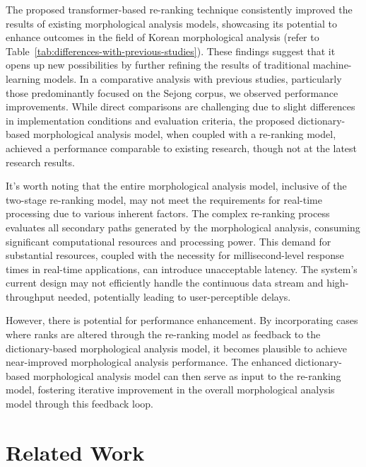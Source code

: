 \documentclass[AMS,STIX2COL]{WileyNJD-v2}
\begin{document}
    The proposed transformer-based re-ranking technique consistently improved the results of existing morphological analysis models, showcasing its potential to enhance outcomes in the field of Korean morphological analysis (refer to Table~\ref{tab:differences-with-previous-studies}).
    These findings suggest that it opens up new possibilities by further refining the results of traditional machine-learning models.
    In a comparative analysis with previous studies, particularly those predominantly focused on the Sejong corpus, we observed performance improvements.
    While direct comparisons are challenging due to slight differences in implementation conditions and evaluation criteria, the proposed dictionary-based morphological analysis model, when coupled with a re-ranking model, achieved a performance comparable to existing research, though not at the latest research results.

    It's worth noting that the entire morphological analysis model, inclusive of the two-stage re-ranking model, may not meet the requirements for real-time processing due to various inherent factors.
    The complex re-ranking process evaluates all secondary paths generated by the morphological analysis, consuming significant computational resources and processing power.
    This demand for substantial resources, coupled with the necessity for millisecond-level response times in real-time applications, can introduce unacceptable latency.
    The system's current design may not efficiently handle the continuous data stream and high-throughput needed, potentially leading to user-perceptible delays.

    However, there is potential for performance enhancement.
    By incorporating cases where ranks are altered through the re-ranking model as feedback to the dictionary-based morphological analysis model, it becomes plausible to achieve near-improved morphological analysis performance.
    The enhanced dictionary-based morphological analysis model can then serve as input to the re-ranking model, fostering iterative improvement in the overall morphological analysis model through this feedback loop.


    \section{Related Work}\label{sec:related-work}
\end{document}
